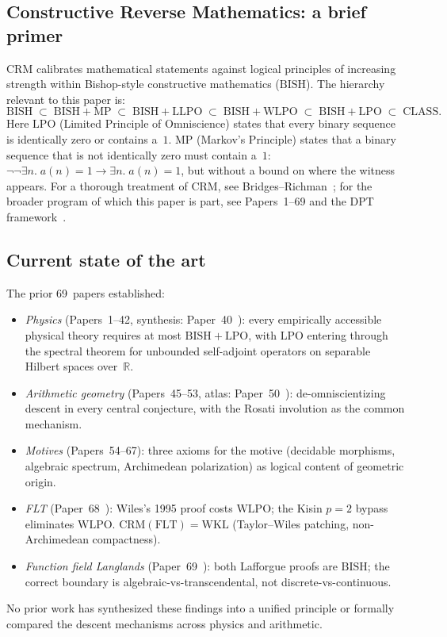 \documentclass[11pt]{article}
\theoremstyle{definition}
\theoremstyle{remark}
\newcommand{\R}{\mathbb{R}}
\newcommand{\BISH}{\mathrm{BISH}}
\newcommand{\LPO}{\mathrm{LPO}}
\newcommand{\WLPO}{\mathrm{WLPO}}
\newcommand{\LLPO}{\mathrm{LLPO}}
\newcommand{\WKL}{\mathrm{WKL}}
\newcommand{\MP}{\mathrm{MP}}
\newcommand{\CLASS}{\mathrm{CLASS}}
\newcommand{\CRM}{\mathrm{CRM}}
\begin{document}
\subsection{Constructive Reverse Mathematics: a brief primer}

$\CRM$ calibrates mathematical statements against logical principles of increasing strength within Bishop-style constructive mathematics ($\BISH$). The hierarchy relevant to this paper is:
\[
\BISH \;\subset\; \BISH + \MP \;\subset\; \BISH + \LLPO \;\subset\; \BISH + \WLPO \;\subset\; \BISH + \LPO \;\subset\; \CLASS.
\]
Here $\LPO$ (Limited Principle of Omniscience) states that every binary sequence is identically zero or contains a~$1$. $\MP$ (Markov's Principle) states that a binary sequence that is not identically zero must contain a~$1$: $\neg\neg\exists n.\; a(n) = 1 \to \exists n.\; a(n) = 1$, but without a bound on where the witness appears. For a thorough treatment of $\CRM$, see Bridges--Richman~\cite{BridgesRichman}; for the broader program of which this paper is part, see Papers~1--69 and the DPT framework~\cite{Paper50}.

\subsection{Current state of the art}

The prior 69~papers established:
\begin{itemize}
\item \emph{Physics} (Papers~1--42, synthesis: Paper~40~\cite{Paper40}): every empirically accessible physical theory requires at most $\BISH + \LPO$, with $\LPO$ entering through the spectral theorem for unbounded self-adjoint operators on separable Hilbert spaces over~$\R$.
\item \emph{Arithmetic geometry} (Papers~45--53, atlas: Paper~50~\cite{Paper50}): de-omniscientizing descent in every central conjecture, with the Rosati involution as the common mechanism.
\item \emph{Motives} (Papers~54--67): three axioms for the motive (decidable morphisms, algebraic spectrum, Archimedean polarization) as logical content of geometric origin.
\item \emph{FLT} (Paper~68~\cite{Paper68}): Wiles's 1995 proof costs $\WLPO$; the Kisin $p = 2$ bypass eliminates $\WLPO$. $\CRM(\mathrm{FLT}) = \WKL$ (Taylor--Wiles patching, non-Archimedean compactness).
\item \emph{Function field Langlands} (Paper~69~\cite{Paper69}): both Lafforgue proofs are $\BISH$; the correct boundary is algebraic-vs-transcendental, not discrete-vs-continuous.
\end{itemize}
No prior work has synthesized these findings into a unified principle or formally compared the descent mechanisms across physics and arithmetic.
\end{document}
